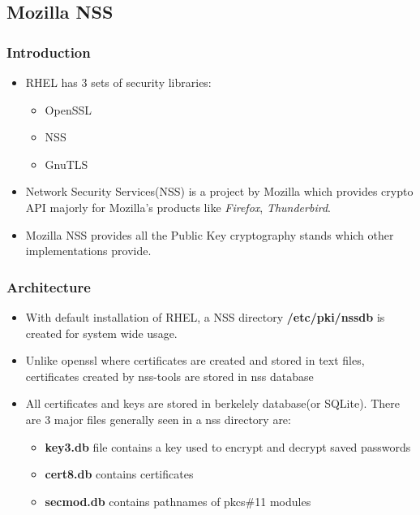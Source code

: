 \documentclass[a4paper]{article}
\begin{document}
    \subsection{Mozilla NSS}
        \subsubsection{Introduction}
            \begin{itemize}
                \item RHEL has 3 sets of security libraries:
                        \begin{itemize}
                            \item OpenSSL
                            \item NSS
                            \item GnuTLS
                        \end{itemize}
                \item Network Security Services(NSS) is a project by Mozilla which provides crypto API majorly for Mozilla's products like 
                    \textit{Firefox}, \textit{Thunderbird}. 
                \item Mozilla NSS provides all the Public Key cryptography stands which other implementations provide. 
            \end{itemize}
        \subsubsection{Architecture}
            \begin{itemize}
                \item With default installation of RHEL, a NSS directory \textbf{/etc/pki/nssdb} is created for system wide usage. 
                \item Unlike openssl where certificates are created and stored in text files, certificates created by nss-tools are stored in nss database
                \item All certificates and keys  are stored in berkelely database(or SQLite). There are 3 major files generally seen in a nss directory are:
                    \begin{itemize}
                        \item \textbf{key3.db} file contains a key used to encrypt and decrypt saved passwords
                        \item \textbf{cert8.db} contains certificates
                        \item \textbf{secmod.db} contains pathnames of pkcs\#11 modules
                    \end{itemize}
             \end{itemize}
\end{document}
